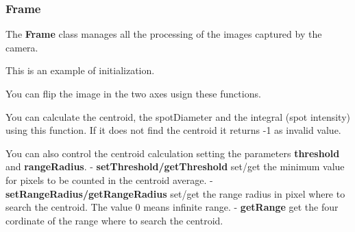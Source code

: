 \hypertarget{frame}{%
\subsubsection{Frame}\label{frame}}

The \textbf{Frame} class manages all the processing of the images
captured by the camera.

\begin{Shaded}
\begin{Highlighting}[]
\end{Highlighting}
\end{Shaded}

This is an example of initialization.

\begin{Shaded}
\begin{Highlighting}[]
\NormalTok{;}
\NormalTok{;}
 \NormalTok{\};}
\end{Highlighting}
\end{Shaded}

You can flip the image in the two axes usign these functions.

\begin{Shaded}
\begin{Highlighting}[]
\end{Highlighting}
\end{Shaded}

You can calculate the centroid, the spotDiameter and the integral (spot
intensity) using this function. If it does not find the centroid it
returns -1 as invalid value.

\begin{Shaded}
\begin{Highlighting}[]
\end{Highlighting}
\end{Shaded}

You can also control the centroid calculation setting the parameters
\textbf{threshold} and \textbf{rangeRadius}. -
\textbf{setThreshold/getThreshold} set/get the minimum value for pixels
to be counted in the centroid average. -
\textbf{setRangeRadius/getRangeRadius} set/get the range radius in pixel
where to search the centroid. The value 0 means infinite range. -
\textbf{getRange} get the four cordinate of the range where to search
the centroid.

